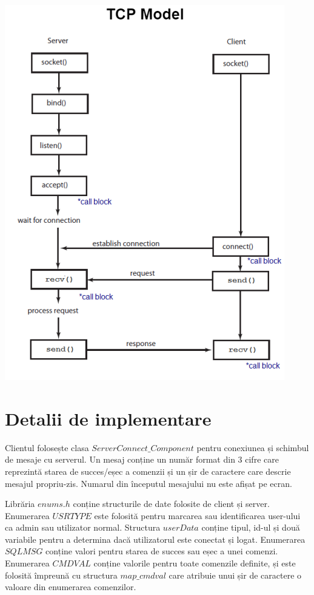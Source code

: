 \documentclass{article}
\begin{document}
\includegraphics[width=\textwidth]{tcp}
\pagebreak


\section{Detalii de implementare}

\hspace{4mm} Clientul folosește clasa $ServerConnect\_Component$ pentru conexiunea și schimbul de mesaje cu serverul. Un mesaj conține un număr format din 3 cifre care reprezintă starea de succes/eșec a comenzii și un șir de caractere care descrie mesajul propriu-zis. Numarul din începutul mesajului nu este afișat pe ecran. 

Librăria $enums.h$ conține structurile de date folosite de client și server. Enumerarea $USRTYPE$ este folosită pentru marcarea sau identificarea user-ului ca admin sau utilizator normal. Structura $userData$ conține tipul, id-ul și două variabile pentru a determina dacă utilizatorul este conectat și logat. Enumerarea $SQLMSG$ conține valori pentru starea de succes sau eșec a unei comenzi. Enumerarea $CMDVAL$ conține valorile pentru toate comenzile definite, și este folosită împreună cu structura $map\_cmdval$ care atribuie unui șir de caractere o valoare din enumerarea comenzilor.
\end{document}
